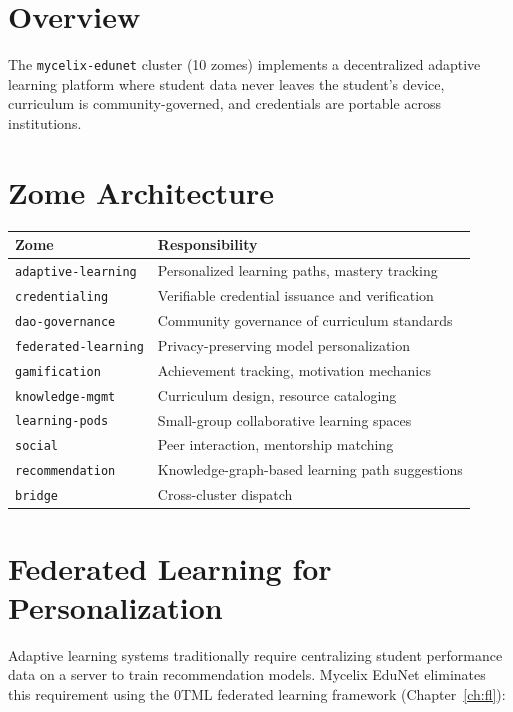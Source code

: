 \documentclass[12pt]{book}
\begin{document}
\section{Overview}

The \texttt{mycelix-edunet} cluster (10 zomes) implements a decentralized
adaptive learning platform where student data never leaves the
student's device, curriculum is community-governed, and credentials
are portable across institutions.

\section{Zome Architecture}

\begin{longtable}{lp{8cm}}
\toprule
\textbf{Zome} & \textbf{Responsibility} \\
\midrule
\endhead
\texttt{adaptive-learning}  & Personalized learning paths, mastery tracking \\
\texttt{credentialing}      & Verifiable credential issuance and verification \\
\texttt{dao-governance}     & Community governance of curriculum standards \\
\texttt{federated-learning} & Privacy-preserving model personalization \\
\texttt{gamification}       & Achievement tracking, motivation mechanics \\
\texttt{knowledge-mgmt}     & Curriculum design, resource cataloging \\
\texttt{learning-pods}      & Small-group collaborative learning spaces \\
\texttt{social}             & Peer interaction, mentorship matching \\
\texttt{recommendation}     & Knowledge-graph-based learning path suggestions \\
\texttt{bridge}             & Cross-cluster dispatch \\
\bottomrule
\end{longtable}

\section{Federated Learning for Personalization}

Adaptive learning systems traditionally require centralizing student
performance data on a server to train recommendation models.  Mycelix
EduNet eliminates this requirement using the 0TML federated learning
framework (Chapter~\ref{ch:fl}):
\end{document}

